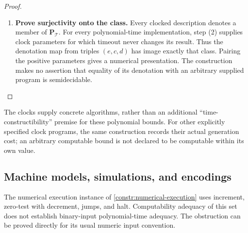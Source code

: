 \documentclass[11pt,a4paper]{article}
\numberwithin{algorithm}{section}
\numberwithin{equation}{section}
\theoremstyle{definition}
\theoremstyle{remark}
\theoremstyle{plain}
\theoremstyle{definition}
\theoremstyle{plain}
\begin{document}
\begin{proof}
\begin{enumerate}[leftmargin=*,align=left]
halts in polynomial time, including when $e$ is invalid or partial.
The degree belongs to the fixed compiled description; this does not
assert one polynomial degree for an interpreter taking $d$ as input.
\item \textbf{Prove surjectivity onto the class.}
Every clocked description denotes a member of $\mathbf P_{\mathcal T}$.
For every polynomial-time implementation, step (2) supplies clock
parameters for which timeout never changes its result. Thus the
denotation map from triples $(e,c,d)$ has image exactly that class.
Pairing the positive parameters gives a numerical presentation.
The construction makes no assertion that equality of its denotation
with an arbitrary supplied program is semidecidable.
\end{enumerate}
\end{proof}

The clocks supply concrete algorithms, rather than an additional
``time-constructibility'' premise for these polynomial bounds. For
other explicitly specified clock programs, the same construction
records their actual generation cost; an arbitrary computable bound
is not declared to be computable within its own value.


\subsection{Machine models, simulations, and encodings}
\label{sec:wc-simulation}

The numerical execution instance of \cref{constr:numerical-execution}
uses increment, zero-test with decrement, jumps, and halt. Computability adequacy of this set does not
establish binary-input polynomial-time adequacy. The obstruction can be
proved directly for its usual numeric input convention.
\end{document}
